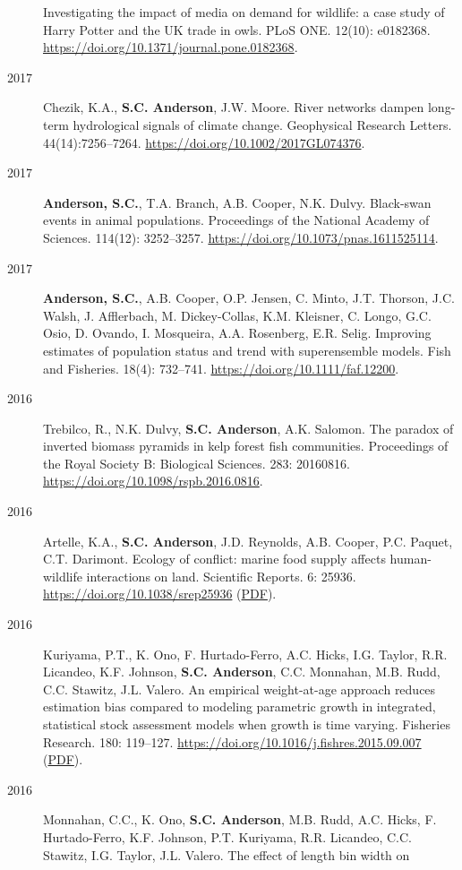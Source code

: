 \begin{description}
Investigating the impact of media on demand for wildlife: a case study
of Harry Potter and the UK trade in owls. PLoS ONE. 12(10): e0182368.
\url{https://doi.org/10.1371/journal.pone.0182368}.
\item[2017]
Chezik, K.A., \textbf{S.C. Anderson}, J.W. Moore. River networks dampen
long-term hydrological signals of climate change. Geophysical Research
Letters. 44(14):7256--7264. \url{https://doi.org/10.1002/2017GL074376}.
\item[2017]
\textbf{Anderson, S.C.}, T.A. Branch, A.B. Cooper, N.K. Dulvy.
Black-swan events in animal populations. Proceedings of the National
Academy of Sciences. 114(12): 3252--3257.
\url{https://doi.org/10.1073/pnas.1611525114}.
\item[2017]
\textbf{Anderson, S.C.}, A.B. Cooper, O.P. Jensen, C. Minto, J.T.
Thorson, J.C. Walsh, J. Afflerbach, M. Dickey-Collas, K.M. Kleisner, C.
Longo, G.C. Osio, D. Ovando, I. Mosqueira, A.A. Rosenberg, E.R. Selig.
Improving estimates of population status and trend with superensemble
models. Fish and Fisheries. 18(4): 732--741.
\url{https://doi.org/10.1111/faf.12200}.
\item[2016]
Trebilco, R., N.K. Dulvy, \textbf{S.C. Anderson}, A.K. Salomon. The
paradox of inverted biomass pyramids in kelp forest fish communities.
Proceedings of the Royal Society B: Biological Sciences. 283: 20160816.
\url{https://doi.org/10.1098/rspb.2016.0816}.
\item[2016]
Artelle, K.A., \textbf{S.C. Anderson}, J.D. Reynolds, A.B. Cooper, P.C.
Paquet, C.T. Darimont. Ecology of conflict: marine food supply affects
human-wildlife interactions on land. Scientific Reports. 6: 25936.
\url{https://doi.org/10.1038/srep25936}
(\href{http://www.nature.com/articles/srep25936.pdf}{PDF}).
\item[2016]
Kuriyama, P.T., K. Ono, F. Hurtado-Ferro, A.C. Hicks, I.G. Taylor, R.R.
Licandeo, K.F. Johnson, \textbf{S.C. Anderson}, C.C. Monnahan, M.B.
Rudd, C.C. Stawitz, J.L. Valero. An empirical weight-at-age approach
reduces estimation bias compared to modeling parametric growth in
integrated, statistical stock assessment models when growth is time
varying. Fisheries Research. 180: 119--127.
\url{https://doi.org/10.1016/j.fishres.2015.09.007}
(\href{https://www.dropbox.com/s/425a18a4xm9kq8l/Kuriyama_etal_2016_empirical.pdf?dl=1}{PDF}).
\item[2016]
Monnahan, C.C., K. Ono, \textbf{S.C. Anderson}, M.B. Rudd, A.C. Hicks,
F. Hurtado-Ferro, K.F. Johnson, P.T. Kuriyama, R.R. Licandeo, C.C.
Stawitz, I.G. Taylor, J.L. Valero. The effect of length bin width on

\end{description}
